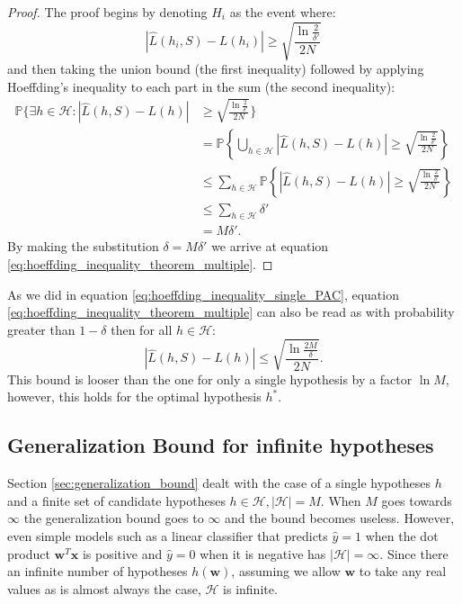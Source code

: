 \documentclass[a4paper, twoside, nobib]{tufte-book}
\renewcommand{\vec}[1]{\mathbf{#1}}
\begin{document}
\begin{proof}
  The proof begins by denoting $H_i$ as the event where: 
  \begin{equation*}
    \left| \hat{L}(h_i, S) - L(h_i) \right| \geq \sqrt{\frac{\ln \frac{2}{\delta'}}{2N}}
  \end{equation*}
   and then taking the union bound (the first inequality) followed by applying Hoeffding's inequality to each part in the sum (the second inequality): 
\begin{equation*}
  \begin{split}
    \mathbb{P} \Biggl\{ \exists h \in \mathcal{H}: \left| \hat{L}(h, S) - L(h) \right| &\geq \sqrt{\frac{\ln \frac{2}{\delta'}}{2N}}  \Biggr\} \\
    &= \mathbb{P} \left\{ \bigcup_{h \in \mathcal{H}} \left| \hat{L}(h, S) - L(h) \right| \geq \sqrt{\frac{\ln \frac{2}{\delta'}}{2N}}  \right\}  \\
    &\leq \sum_{h \in \mathcal{H}} \mathbb{P} \left\{\left| \hat{L}(h, S) - L(h) \right| \geq \sqrt{\frac{\ln \frac{2}{\delta'}}{2N}} \right\}  \\
    &\leq \sum_{h \in \mathcal{H}} \delta' \\
    &= M \delta'.
  \end{split}
\end{equation*}
By making the substitution $\delta = M \delta'$ we arrive at equation \eqref{eq:hoeffding_inequality_theorem_multiple}. 
\end{proof}

As we did in equation \eqref{eq:hoeffding_inequality_single_PAC}, equation \eqref{eq:hoeffding_inequality_theorem_multiple} can also be read as with probability greater than $1-\delta$ then for all $h\in\mathcal{H}$:
\begin{equation}
  \label{eq:hoeffding_inequality_multi_PAC}
  \left| \hat{L}(h, S) - L(h) \right| \leq \sqrt{\frac{\ln \frac{2M}{\delta}}{2N}}.
\end{equation}
This bound is looser than the one for only a single hypothesis by a factor $\ln M$, however, this holds for the optimal hypothesis $h^*$. 

\subsection{Generalization Bound for infinite hypotheses}
\label{subsec:generalization_bound_infinite}
Section \ref{sec:generalization_bound} dealt with the case of a single hypotheses $h$ and a finite set of candidate hypotheses $h\in\mathcal{H}, |\mathcal{H}| = M$. When $M$ goes towards $\infty$ the generalization bound goes to $\infty$ and the bound becomes useless. However, even simple models such as a linear classifier that predicts $\hat{y}=1$ when the dot product $\vec{w}^T\vec{x}$ is positive and $\hat{y}=0$ when it is negative has $|\mathcal{H}| = \infty$. Since there an infinite number of hypotheses $h(\vec{w})$, assuming we allow $\vec{w}$ to take any real values as is almost always the case, $\mathcal{H}$ is infinite. 
\end{document}
